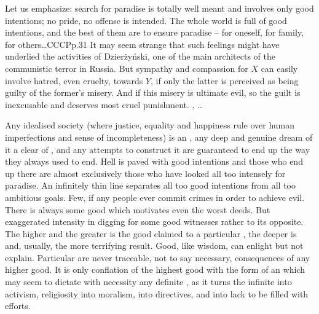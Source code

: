 \pa\label{wellmeant} %
Let us emphasize: search for paradise is totally well meant and involves only good
intentions; no pride, no offense is intended.
The whole world is full of good intentions, and the best of them are to
ensure paradise -- for oneself, for family, for others\ldots \citet{I would like my
  love to embrace the whole mankind, to warm it and clean it from the dirt of 
  modern life [...] Often it seems to me that even mother does not love
  children as warmly as I do.}{CCCP}{p.31 }
It may seem strange that such feelings might have underlied the activities of
 Dzier\.{z}y\'{n}ski, one of the main architects of the 
communistic terror in Russia. But sympathy and compassion for $X$ can easily
involve hatred, even cruelty, towards $Y$, if only the latter is perceived as
being guilty of the former's misery. And if this misery is ultimate evil, so the
guilt is inexcusable and deserves most cruel punishment. ,
\ldots

Any idealised society (where justice, equality and happiness rule over human
imperfections and sense of incompleteness) is an , any deep and genuine
dream of it a clear  of , and any attempts to construct
it are guaranteed to end up the way they always used to end.  Hell is paved with
good intentions and those who end up there are almost exclusively those who have
looked all too intensely for paradise. An infinitely thin line separates all too
good intentions from all too ambitious goals.  Few, if any people ever
commit crimes in order to achieve evil. There is always some good which
motivates even the worst deeds. But exaggerated intensity in digging for some 
good witnesses rather to its opposite. The higher and the greater is the good claimed
to  a particular , the deeper is 
and, usually, the more terrifying result. Good, like wisdom, can enlight but not explain.
Particular  are never  traceable, not to say necessary,
consequences of any higher good. It is only conflation of the highest good with
the  form of an  which may seem to dictate with necessity
any definite , as it turns the infinite  into activism,
religiosity into moralism,  into directives, and  into
lack to be filled with  efforts.

